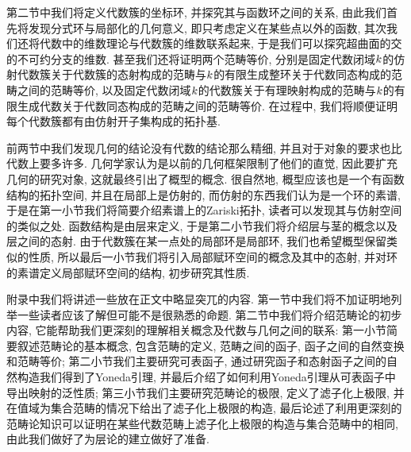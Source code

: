 第二节中我们将定义代数簇的坐标环, 并探究其与函数环之间的关系, 由此我们首先将发现分式环与局部化的几何意义, 即只考虑定义在某些点以外的函数, 其次我们还将代数中的维数理论与代数簇的维数联系起来, 于是我们可以探究超曲面的交的不可约分支的维数. 甚至我们还将证明两个范畴等价, 分别是固定代数闭域$k$的仿射代数簇关于代数簇的态射构成的范畴与$k$的有限生成整环关于代数同态构成的范畴之间的范畴等价, 以及固定代数闭域$k$的代数簇关于有理映射构成的范畴与$k$的有限生成代数关于代数同态构成的范畴之间的范畴等价. 在过程中, 我们将顺便证明每个代数簇都有由仿射开子集构成的拓扑基.

前两节中我们发现几何的结论没有代数的结论那么精细, 并且对于对象的要求也比代数上要多许多. 几何学家认为是以前的几何框架限制了他们的直觉, 因此要扩充几何的研究对象, 这就最终引出了概型的概念. 很自然地, 概型应该也是一个有函数结构的拓扑空间, 并且在局部上是仿射的, 而仿射的东西我们认为是一个环的素谱, 于是在第一小节我们将简要介绍素谱上的Zariski拓扑, 读者可以发现其与仿射空间的类似之处. 函数结构是由层来定义, 于是第二小节我们将介绍层与茎的概念以及层之间的态射. 由于代数簇在某一点处的局部环是局部环, 我们也希望概型保留类似的性质, 所以最后一小节我们将引入局部赋环空间的概念及其中的态射, 并对环的素谱定义局部赋环空间的结构, 初步研究其性质.

\bigskip

附录中我们将讲述一些放在正文中略显突兀的内容. 第一节中我们将不加证明地列举一些读者应该了解但可能不是很熟悉的命题. 第二节中我们将介绍范畴论的初步内容, 它能帮助我们更深刻的理解相关概念及代数与几何之间的联系: 第一小节简要叙述范畴论的基本概念, 包含范畴的定义, 范畴之间的函子, 函子之间的自然变换和范畴等价; 第二小节我们主要研究可表函子, 通过研究函子和态射函子之间的自然构造我们得到了Yoneda引理, 并最后介绍了如何利用Yoneda引理从可表函子中导出映射的泛性质; 第三小节我们主要研究范畴论的极限, 定义了滤子化上极限, 并在值域为集合范畴的情况下给出了滤子化上极限的构造, 最后论述了利用更深刻的范畴论知识可以证明在某些代数范畴上滤子化上极限的构造与集合范畴中的相同, 由此我们做好了为层论的建立做好了准备.




